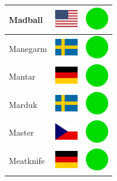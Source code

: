 \documentclass[12pt, a4paper, twoside]{report}
\begin{document}
\begin{center}
\begin{longtable}{|p{5cm}|p{2cm}|p{2cm}|}
Madball & \includegraphics[width=1cm]{4x3/us} & \includegraphics[width=1cm]{likes/y} \\ \hline
Manegarm & \includegraphics[width=1cm]{4x3/se} & \includegraphics[width=1cm]{likes/y} \\ \hline
Mantar & \includegraphics[width=1cm]{4x3/de} & \includegraphics[width=1cm]{likes/y} \\ \hline
Marduk & \includegraphics[width=1cm]{4x3/se} & \includegraphics[width=1cm]{likes/y} \\ \hline
Master & \includegraphics[width=1cm]{4x3/cz} & \includegraphics[width=1cm]{likes/y} \\ \hline
Meatknife & \includegraphics[width=1cm]{4x3/de} & \includegraphics[width=1cm]{likes/y} \\ \hline

\end{longtable}
\end{center}
\end{document}
